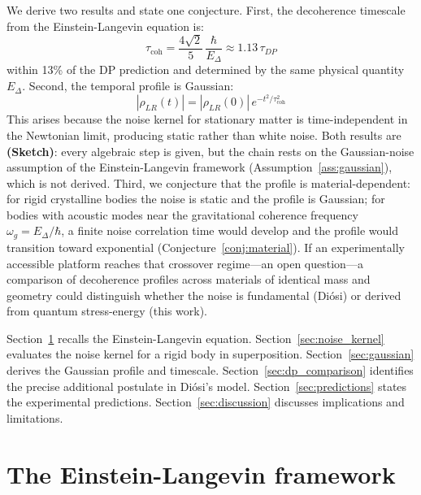 \documentclass[12pt,a4paper]{article}
\theoremstyle{remark}
\begin{document}
We derive two results and state one conjecture. First, the decoherence timescale from the
Einstein-Langevin equation is:
\begin{equation}
\tau_{\text{coh}} = \frac{4\sqrt{2}}{5}\,\frac{\hbar}{E_\Delta} \approx 1.13\,\tau_{DP}
\label{eq:tau_coh_preview}
\end{equation}
within 13\% of the DP prediction and determined by the same physical quantity $E_\Delta$.
Second, the temporal profile is Gaussian:
\begin{equation}
|\rho_{LR}(t)| = |\rho_{LR}(0)|\,e^{-t^2/\tau_{\text{coh}}^2}
\label{eq:gaussian_preview}
\end{equation}
This arises because the noise kernel for stationary matter is time-independent in the
Newtonian limit, producing static rather than white noise. Both results are
\textbf{(Sketch)}: every algebraic step is given, but the chain rests on the Gaussian-noise
assumption of the Einstein-Langevin framework (Assumption~\ref{ass:gaussian}), which is
not derived. Third, we conjecture that the profile is material-dependent: for rigid
crystalline bodies the noise is static and the profile is Gaussian; for bodies with
acoustic modes near the gravitational coherence frequency $\omega_g = E_\Delta/\hbar$, a
finite noise correlation time would develop and the profile would transition toward
exponential (Conjecture~\ref{conj:material}). If an experimentally accessible platform
reaches that crossover regime---an open question---a comparison of decoherence profiles
across materials of identical mass and geometry could distinguish whether the noise is
fundamental (Di\'osi) or derived from quantum stress-energy (this work).

Section~\ref{sec:framework} recalls the Einstein-Langevin equation.
Section~\ref{sec:noise_kernel} evaluates the noise kernel for a rigid body in
superposition. Section~\ref{sec:gaussian} derives the Gaussian profile and timescale.
Section~\ref{sec:dp_comparison} identifies the precise additional postulate in Di\'osi's
model. Section~\ref{sec:predictions} states the experimental predictions.
Section~\ref{sec:discussion} discusses implications and limitations.

\section{The Einstein-Langevin framework}
\label{sec:framework}
\end{document}
